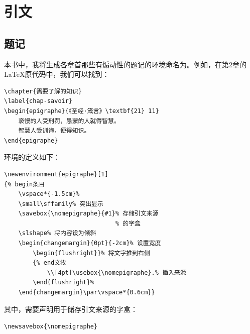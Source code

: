 \section{引文}

\subsection{题记}

本书中，我将生成各章首那些有煽动性的题记的环境命名为。例如，在第2章的\LaTeX 原代码中，我们可以找到：

\begin{dmd}
\begin{verbatim}
\chapter{需要了解的知识}
\label{chap-savoir}
\begin{epigraphe}{《圣经·箴言》\textbf{21} 11}
    亵慢的人受刑罚，愚蒙的人就得智慧。
    智慧人受训诲，便得知识。
\end{epigraphe}\end{verbatim}
\end{dmd}

环境的定义如下：

\begin{dmd}
\begin{verbatim}
\newenvironment{epigraphe}[1] 
{% begin条目
    \vspace*{-1.5cm}%
    \small\sffamily% 突出显示
    \savebox{\nomepigraphe}{#1}% 存储引文来源
                               % 的字盒
    \slshape% 将内容设为倾斜
    \begin{changemargin}{0pt}{-2cm}% 设置宽度
        \begin{flushright}}% 将文字推到右侧
        {% end文牧
            \\[4pt]\usebox{\nomepigraphe}.% 插入来源
        \end{flushright}%
    \end{changemargin}\par\vspace*{0.6cm}}\end{verbatim}
\end{dmd}

其中，需要声明用于储存引文来源的字盒：

\begin{dmd}
\verb|\newsavebox{\nomepigraphe}|
\end{dmd}

